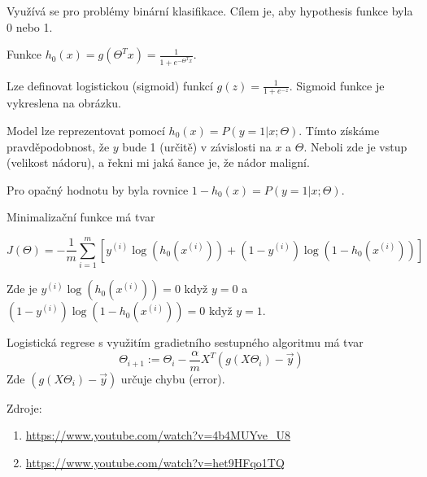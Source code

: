 Využívá se pro problémy binární klasifikace.
Cílem je, aby hypothesis funkce byla 0 nebo 1.

Funkce $h_0(x) = g(\Theta^T x) = \frac{1}{1+e^{-\Theta^T x}}$.

Lze definovat logistickou (sigmoid) funkcí $g(z) = \frac{1}{1+e^{-z}}$.
Sigmoid funkce je vykreslena na obrázku.
\begin{center}
\end{center}

Model lze reprezentovat pomocí $h_0(x) = P(y = 1 | x ; \Theta)$. 
Tímto získáme pravděpodobnost, že $y$ bude 1 (určitě) v závislosti na $x$ a $\Theta$.
Neboli zde je vstup (velikost nádoru), a řekni mi jaká šance je, že nádor maligní.

Pro opačný hodnotu by byla rovnice $1 - h_0(x) = P(y = 1 | x ; \Theta)$.

Minimalizační funkce má tvar 

\[
J(\Theta) = -\frac{1}{m} \sum_{i=1}^{m} \left[ y^{(i)}\log(h_0(x^{(i)})) + (1-y^{(i)})\log(1 - h_0(x^{(i)})) \right]
\]

Zde je $y^{(i)}\log(h_0(x^{(i)})) = 0$ když $y = 0$ a $(1-y^{(i)})\log(1 - h_0(x^{(i)})) = 0$ když $y = 1$.

Logistická regrese s využitím gradietního sestupného algoritmu má tvar 
\[
\Theta_{i+1} := \Theta_i - \frac{\alpha}{m} X^T(g(X\Theta_i) - \vec{y})
\]
Zde $(g(X\Theta_i) - \vec{y})$ určuje chybu (error).


Zdroje:
\begin{enumerate}
    \item \url{https://www.youtube.com/watch?v=4b4MUYve_U8}
    \item \url{https://www.youtube.com/watch?v=het9HFqo1TQ}
\end{enumerate}

